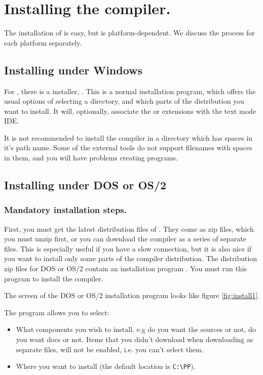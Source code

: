 \section{Installing the compiler.}
The installation of \fpc is easy, but is platform-dependent.
We discuss the process for each platform separately.

\subsection{Installing under Windows}
For \windows, there is a \windows installer, . This is a
normal installation program, which offers the usual options
of selecting a directory, and which parts of the distribution you want
to install. It will, optionally, associate the  or 
extensions with the text mode IDE.

It is not recommended to install the compiler in a directory which
has spaces in it's path name. Some of the external tools do not support
filenames with spaces in them, and you will have problems creating
programs.

\subsection{Installing under DOS or OS/2}
\subsubsection{Mandatory installation steps.}
First, you must get the latest distribution files of \fpc. They come as zip
files, which you must unzip first, or you can download the compiler as a
series of separate files. This is especially useful if you have a slow
connection, but it is also nice if you want to install only some parts of the
compiler distribution.  The distribution zip files for DOS or OS/2 contain an
installation program . You must run this program to install
the compiler.

The screen of the DOS or OS/2 installation program looks like figure 
\ref{fig:install1}.


The program allows you to select:
\begin{itemize}
\item What components you wish to install. e.g do you want the sources or
not, do you want docs or not. Items that you didn't download when
downloading as separate files, will not be enabled, i.e. you can't
select them.

\item Where you want to install (the default location is \verb|C:\PP|).
\end{itemize}

